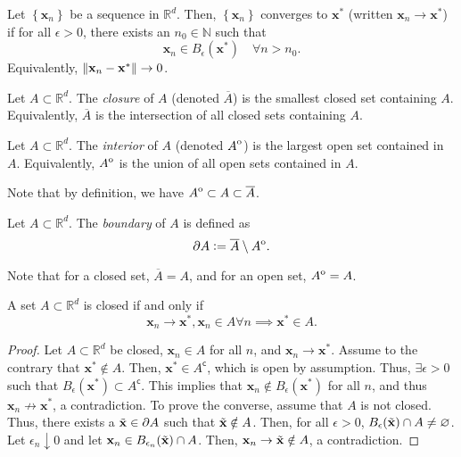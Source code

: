 \begin{defn}
    Let $\left\{ \mathbf{x}_n \right\}$ be a sequence in $\mathbb{R}^d$. Then, $\left\{\mathbf{x}_n\right\}$ converges to $\mathbf{x}^*$ (written $\mathbf{x}_n \to \mathbf{x}^*$) if for all $\epsilon > 0$, there exists an $n_0 \in \mathbb{N}$ such that
    \[
        \mathbf{x}_n \in B_{\epsilon}(\mathbf{x}^*) \quad \forall n > n_0.
    \]
    Equivalently, $\norm{\mathbf{x}_n - \mathbf{x}^*} \to 0$.
\end{defn}

\begin{defn}[Closure]
    Let $A \subset \mathbb{R}^d$. The \emph{closure} of $A$ (denoted $\overline{A}$) is the smallest closed set containing $A$. Equivalently, $\overline{A}$ is the intersection of all closed sets containing $A$.
\end{defn}

\begin{defn}[Interior]
    Let $A \subset \mathbb{R}^d$. The \emph{interior} of $A$ (denoted $\interior{A}$) is the largest open set contained in $A$. Equivalently, $\interior{A}$ is the union of all open sets contained in $A$.
\end{defn}
Note that by definition, we have $\interior{A} \subset A \subset \overline{A}$.

\begin{defn}[Boundary]
    Let $A \subset \mathbb{R}^d$. The \emph{boundary} of $A$ is defined as
    \[
        \partial A \vcentcolon= \overline{A} \setminus \interior{A}.
    \]
\end{defn}
Note that for a closed set, $\overline{A} = A$, and for an open set, $\interior{A} = A$. 

\begin{prop}
    A set $A \subset \mathbb{R}^d$ is closed if and only if
    \[
        \mathbf{x}_n  \to \mathbf{x}^*, \mathbf{x}_n \in A \forall n \implies \mathbf{x}^* \in A.
    \]
\end{prop}
\begin{proof}
    Let $A \subset \mathbb{R}^d$ be closed, $\mathbf{x}_n \in A$ for all $n$, and $\mathbf{x}_n \to \mathbf{x}^*$. Assume to the contrary that $\mathbf{x}^* \notin A$. Then, $\mathbf{x}^* \in A^{\mathsf{c}}$, which is open by assumption. Thus, $\exists \epsilon > 0$ such that $B_{\epsilon}(\mathbf{x}^*) \subset A^{\mathsf{c}}$. This implies that $\mathbf{x}_n \notin B_{\epsilon}(\mathbf{x}^*)$ for all $n$, and thus $\mathbf{x}_n \not\to \mathbf{x}^*$, a contradiction. To prove the converse, assume that $A$ is not closed. Thus, there exists a $\Tilde{\mathbf{x}} \in \partial A$ such that $\Tilde{\mathbf{x}} \notin A$. Then, for all $\epsilon > 0$, $B_{\epsilon}(\Tilde{\mathbf{x}}) \cap A \neq \emptyset$. Let $\epsilon_n \downarrow 0$ and let $\mathbf{x}_n \in B_{\epsilon_n}(\Tilde{\mathbf{x}}) \cap A$. Then, $\mathbf{x}_n \to \Tilde{\mathbf{x}} \notin A$, a contradiction.
\end{proof}

